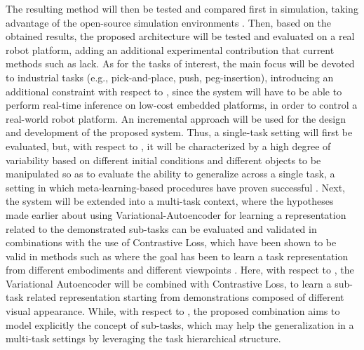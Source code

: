 The resulting method will then be tested and compared first in simulation, taking advantage of the open-source simulation environments \cite{brockman2016openai,zhu2020robosuite}. Then, based on the obtained results, the proposed architecture will be tested and evaluated on a real robot platform, adding an additional experimental contribution that current methods such as \cite{dasari2021transformers_one_shot,mandi2022towards_more_generalizable_one_shot} lack.
\newline As for the tasks of interest, the main focus will be devoted to industrial tasks (e.g., pick-and-place, push, peg-insertion), introducing an additional constraint with respect to \cite{mandi2022towards_more_generalizable_one_shot}, since the system will have to be able to perform real-time inference on low-cost embedded platforms, in order to control a real-world robot platform.
\newline An incremental approach will be used for the design and development of the proposed system. Thus, a single-task setting will first be evaluated, but, with respect to \cite{mandi2022towards_more_generalizable_one_shot}, it will be characterized by a high degree of variability based on different initial conditions and different objects to be manipulated so as to evaluate the ability to generalize across a single task, a setting in which meta-learning-based procedures have proven successful \cite{finn2017one_shot_visual_il,yu2018daml}. Next, the system will be extended into a multi-task context, where the hypotheses made earlier about using Variational-Autoencoder for learning a representation related to the demonstrated sub-tasks can be evaluated and validated in combinations with the use of Contrastive Loss, which have been shown to be valid in methods such as \cite{sermanet2018time_contrastive,zakka2022xirl} where the goal has been to learn a task representation from different embodiments \cite{zakka2022xirl} and different viewpoints \cite{sermanet2018time_contrastive}. Here, with respect to \cite{Mandlekar2020GTI}, the Variational Autoencoder will be combined with Contrastive Loss, to learn a sub-task related representation starting from demonstrations composed of different visual appearance. While, with respect to \cite{mandi2022towards_more_generalizable_one_shot}, the proposed combination aims to model explicitly the concept of sub-tasks, which may help the generalization in a multi-task settings by leveraging the task hierarchical structure.

